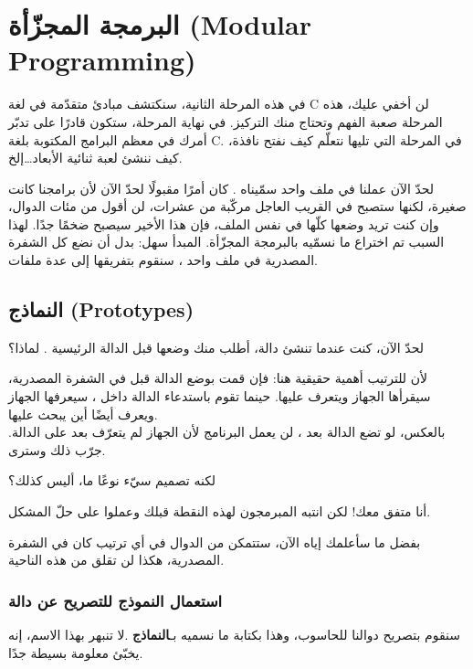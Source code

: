 \chapter{البرمجة المجزّأة (\textenglish{Modular Programming})}

في هذه المرحلة الثانية، سنكتشف مبادئ متقدّمة في لغة \textenglish{C}
 لن أخفي عليك، هذه المرحلة صعبة الفهم وتحتاج منك التركيز. في نهاية المرحلة، ستكون قادرًا على تدبّر أمرك في معظم البرامج المكتوبة بلغة \textenglish{C}. 
في المرحلة التي تليها نتعلّم كيف نفتح نافذة، كيف ننشئ لعبة ثنائية الأبعاد\dots إلخ.

لحدّ الآن عملنا في ملف واحد سمّيناه
.
كان أمرًا مقبولًا لحدّ الآن لأن برامجنا كانت صغيرة، لكنها ستصبح في القريب العاجل مركّبة من عشرات، لن أقول من مئات الدوال، وإن كنت تريد وضعها كلّها في نفس الملف، فإن هذا الأخير سيصبح ضخمًا جدًا. لهذا السبب تم اختراع ما نسمّيه بالبرمجة المجزّأة. المبدأ سهل: بدل أن نضع كل الشفرة المصدرية في ملف واحد
، سنقوم بتفريقها إلى عدة ملفات.

\section{النماذج (\textenglish{Prototypes})}

لحدّ الآن، كنت عندما تنشئ دالة، أطلب منك وضعها قبل الدالة الرئيسية
. لماذا؟

لأن للترتيب أهمية حقيقية هنا: فإن قمت بوضع الدالة قبل 
في الشفرة المصدرية، سيقرأها الجهاز ويتعرف عليها. حينما تقوم باستدعاء الدالة داخل 
، سيعرفها الجهاز ويعرف أيضًا أين يبحث عليها.\\
بالعكس، لو تضع الدالة بعد 
، لن يعمل البرنامج لأن الجهاز لم يتعرّف بعد على الدالة. جرّب ذلك وسترى.

\begin{question}
  لكنه تصميم سيّء نوعًا ما، أليس كذلك؟
\end{question}

أنا متفق معك! لكن انتبه المبرمجون لهذه النقطة قبلك وعملوا على حلّ المشكل.

بفضل ما سأعلمك إياه الآن، ستتمكن من الدوال في أي ترتيب كان في الشفرة المصدرية، هكذا لن تقلق من هذه الناحية.

\subsection{استعمال النموذج للتصريح عن دالة}

سنقوم بتصريح دوالنا للحاسوب، وهذا بكتابة ما نسميه بـ\textbf{النماذج}
.لا تنبهر بهذا الاسم، إنه يخبّئ معلومة بسيطة جدًا.

